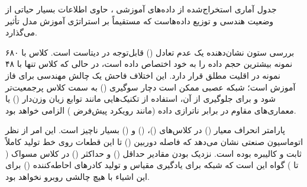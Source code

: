 \documentclass{article}
\begin{document}
\begin{table}[htbp]
	\centering
	\caption{خلاصه آماری مساحت نرمال‌شده اشیاء به تفکیک کلاس‌ها ()}
	\label{tab:eda_summary}
	\vspace{2mm} %
\end{table}

جدول آماری استخراج‌شده از داده‌های آموزشی ، حاوی اطلاعات بسیار حیاتی از وضعیت هندسی و توزیع داده‌هاست که مستقیماً بر استراتژی آموزش مدل تأثیر می‌گذارد.

بررسی ستون  نشان‌دهنده یک عدم تعادل () قابل‌توجه در دیتاست است. کلاس  با ۶۸۰ نمونه بیشترین حجم داده را به خود اختصاص داده است، در حالی که کلاس  تنها با ۴۸ نمونه در اقلیت مطلق قرار دارد. این اختلاف فاحش یک چالش مهندسی برای فاز آموزش است؛ شبکه عصبی ممکن است دچار سوگیری () به سمت کلاس پرجمعیت‌تر شود و برای جلوگیری از آن، استفاده از تکنیک‌هایی مانند توابع زیان وزن‌دار () یا معماری‌های مقاوم در برابر ناترازی داده (مانند رویکرد پیش‌فرض ) الزامی خواهد بود.

پارامتر انحراف معیار () در کلاس‌های  ()،  () و  () بسیار ناچیز است. این امر از نظر اتوماسیون صنعتی نشان می‌دهد که فاصله دوربین () تا این قطعات روی خط تولید کاملاً ثابت و کالیبره بوده است. نزدیک بودن مقادیر حداقل () و حداکثر () در کلاس مسواک ( تا ) گواه این است که شبکه  برای یادگیری مقیاس و تولید کادرهای احاطه‌کننده () برای این اشیاء با هیچ چالشی روبرو نخواهد بود.
\end{document}
